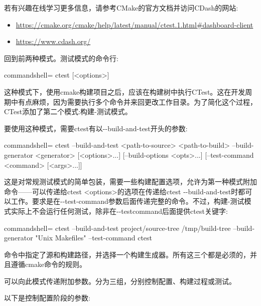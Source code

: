 \begin{tcolorbox}[colback=blue!5!white,colframe=blue!75!black,title=Note]
若有兴趣在线学习更多信息，请参考CMake的官方文档并访问CDash的网站:
\begin{itemize}
\item 
\url{https://cmake.org/cmake/help/latest/manual/ctest.1.html\#dashboard-client}

\item 
\url{https://www.cdash.org/}
\end{itemize}
\end{tcolorbox}

回到前两种模式。测试模式的命令行:

\begin{tcblisting}{commandshell={}}
ctest [<options>]
\end{tcblisting}

这种模式下，使用cmake构建项目之后，应该在构建树中执行CTest。这在开发周期中有点麻烦，因为需要执行多个命令并来回更改工作目录。为了简化这个过程，CTest添加了第二个模式:构建-测试模式。


要使用这种模式，需要ctest有以-{}-build-and-test开头的参数:

\begin{tcblisting}{commandshell={}}
ctest --build-and-test <path-to-source> <path-to-build>
      --build-generator <generator> [<options>...]
      [--build-options <opts>...]
      [--test-command <command> [<args>...]]
\end{tcblisting}

这是对常规测试模式的简单包装，需要一些构建配置选项，允许为第一种模式附加命令——可以传递给ctest <options>的选项在传递给ctest -{}-build-and-test时都可以工作。要求是在-{}-test-command参数后面传递完整的命令。不过，构建-测试模式实际上不会运行任何测试，除非在-{}-testcommand后面提供ctest关键字:

\begin{tcblisting}{commandshell={}}
ctest --build-and-test project/source-tree /tmp/build-tree
--build-generator "Unix Makefiles" --test-command ctest
\end{tcblisting}

命令中指定了源和构建路径，并选择一个构建生成器。所有这三个都是必须的，并且遵循cmake命令的规则。

可以向此模式传递附加参数。分为三组，分别控制配置、构建过程或测试。

以下是控制配置阶段的参数:

